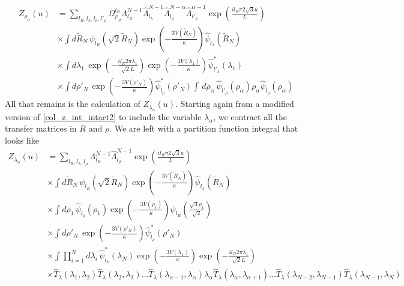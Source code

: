 \begin{align}\label{col_mxd_z_rho_final}
Z_{\rho_\alpha}\left(u\right) &=\sum_{l_R,l_\lambda,l_\rho,l'_{\rho}}\Omega^{l_{R}}_{l'_{\rho}}\Lambda_{l_R}^{N-1}\hat{\Lambda}_{l_\lambda}^{N-1}\hat{\Lambda}_{l_\rho}^{N-\alpha}\hat{\Lambda}_{l'_\rho}^{\alpha-1}\exp\left(\frac{il_{R}\pi 2\sqrt{3}u}{L}\right)\nonumber\\
&\times\int d\tilde{R}_N\,\psi_{l_R}\left(\sqrt{2}\tilde{R}_{N}\right)\exp\left(-\frac{3V\left(\tilde{R}_N\right)}{\kappa}\right)\hat{\psi}_{l_\lambda}\left(\tilde{R}_N\right)\nonumber\\
&\times\int d\lambda_{1}\,\exp\left(-\frac{il_{R}2\pi\lambda_1}{\sqrt{2}L} \right)\exp\left(-\frac{3V(\lambda_{1})}{\kappa}\right)\hat{\psi}^{*}_{l'_\lambda}\left(\lambda_{1}\right)\nonumber\\
&\times\int d\rho'_N\,\exp\left(-\frac{3V(\rho'_{N})}{\kappa}\right)\hat{\psi}^{*}_{l_\rho}\left(\rho'_{N}\right)\int\,d\rho_{\alpha}\,\hat{\psi}_{l'_{\rho}}\left(\rho_{\alpha}\right)\rho_{\alpha}\hat{\psi}_{l_\rho}\left(\rho_{\alpha}\right)
\end{align}
%
All that remains is the calculation of $Z_{\lambda_\alpha}\left(u\right)$. Starting again from a modified version of \eqref{col_z_int_intact2} to include the variable $\lambda_\alpha$, we contract all the transfer matrices in $R$ and $\rho$. We are left with a partition function integral that looks like
%
\begin{align}\label{col_mxd_z_lambda1}
Z_{\lambda_\alpha}\left(u\right) &=\sum_{l_R,l_\lambda,l_\rho}\Lambda_{l_R}^{N-1}\hat{\Lambda}_{l_\rho}^{N-1}\exp\left(\frac{il_{R}\pi 2\sqrt{3}u}{L}\right)\nonumber\\
&\times\int d\tilde{R}_N\,\psi_{l_R}\left(\sqrt{2}\tilde{R}_{N}\right)\exp\left(-\frac{3V\left(\tilde{R}_N\right)}{\kappa}\right)\hat{\psi}_{l_\lambda}\left(\tilde{R}_N\right)\nonumber\\
&\times\int d\rho_1\, \hat{\psi}_{l_\rho}\left(\rho_{1}\right) \exp\left(-\frac{3V(\rho_{1})}{\kappa}\right)\psi_{l_R}\left( \frac{\sqrt{3}\rho_1}{\sqrt{2}}\right)\nonumber\\
&\times\int d\rho'_N\,\exp\left(-\frac{3V(\rho'_{N})}{\kappa}\right)\hat{\psi}^{*}_{l_\rho}\left(\rho'_{N}\right)\nonumber\\
&\times\int\prod^{N}_{i=1}d\lambda_i\,\hat{\psi}^{*}_{l_\lambda}\left(\lambda_{N}\right)\exp\left(-\frac{3V(\lambda_{1})}{\kappa}\right)\exp\left(-\frac{il_{R}2\pi\lambda_1}{\sqrt{2}L} \right)\nonumber\\
&\times \hat{T}_{\lambda}(\lambda_1,\lambda_2)\hat{T}_{\lambda}(\lambda_2,\lambda_3)...\hat{T}_{\lambda}(\lambda_{\alpha-1},\lambda_{\alpha})\lambda_{\alpha}\hat{T}_{\lambda}(\lambda_{\alpha},\lambda_{\alpha+1})...\hat{T}_{\lambda}(\lambda_{N-2},\lambda_{N-1})\hat{T}_{\lambda}(\lambda_{N-1},\lambda_N) 
\end{align}
